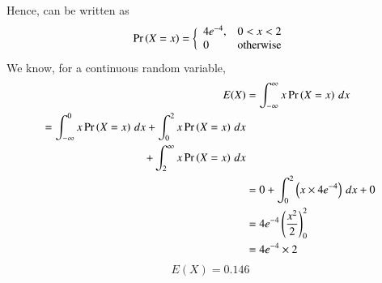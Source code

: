\documentclass[journal,12pt,twocolumn]{IEEEtran}
\begin{document}
Hence,  can be written as
\begin{equation}
    \Pr\left(X=x\right) = \bigg\{ \begin{array}{lr}
         4e^{-4}, &0<x<2  \\
         0 & \text{otherwise} 
    \end{array}
\end{equation}
We know, for a continuous random variable,
\begin{align}
    E(X) &= \int_{- \infty}^{\infty} x \Pr\left(X=x\right) \,dx \\
    \begin{split}
     = \int_{- \infty}^0 x \Pr\left(X=x\right) \,dx + \int_0^2 x \Pr\left(X=x\right) \,dx \\
     + \int_2^{\infty} x \Pr\left(X=x\right) \,dx
    \end{split} \\
    &= 0 + \int_0^2 \left(x \times 4e^{-4}\right) \,dx + 0 \\
    &= 4e^{-4}\left(\frac{x^2}{2}\right)_0^2 \\
    &= 4e^{-4} \times 2 \\
\end{align}
\begin{equation}
    \boxed{E(X) = 0.146}
\end{equation}
\end{document}
